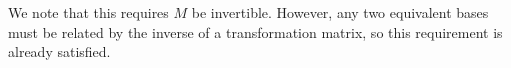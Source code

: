 \documentclass[modern]{aastex62}
\begin{document}
We note that this requires $M$ be invertible.
However, any two equivalent bases must be related by the inverse of a transformation matrix, so this requirement is already satisfied.

% 
%

\end{document}
